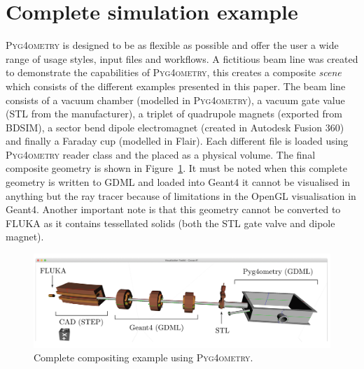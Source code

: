 \documentclass[final,5p,times,twocolumn]{elsarticle}
\newcommand{\PYGEOMETRY}{\textsc{Pyg4ometry}}
\begin{document}
\section{Complete simulation example}
\PYGEOMETRY{} is designed to be as flexible as possible and offer the user a wide range of usage styles, input files 
and workflows. A fictitious beam line was created to demonstrate the capabilities of \PYGEOMETRY, this creates a composite 
{\it scene} which consists of the different examples presented in this paper. The beam line consists of a vacuum chamber 
(modelled in \PYGEOMETRY{}), a vacuum gate value (STL from the manufacturer), a triplet of quadrupole magnets (exported 
from BDSIM), a sector bend dipole electromagnet (created in Autodesk Fusion 360) and finally a Faraday cup (modelled in 
Flair). Each different file is loaded using \PYGEOMETRY{} reader class and the placed as a physical volume. The final composite 
geometry is shown in Figure~\ref{fig:model}. It must be noted when this complete geometry is written to GDML and loaded into 
Geant4 it cannot be visualised in anything but the ray tracer because of limitations in the OpenGL visualisation in Geant4. Another 
important note is that this geometry cannot be converted to FLUKA as it contains tessellated solids (both the STL gate valve and
dipole magnet). 
%
\begin{figure}
\begin{center}
\includegraphics[width=1.0\textwidth]{./model-scene/model.pdf}
\caption{Complete compositing example using \PYGEOMETRY{}.}
\label{fig:model}
\end{center}
\end{figure}
\end{document}
